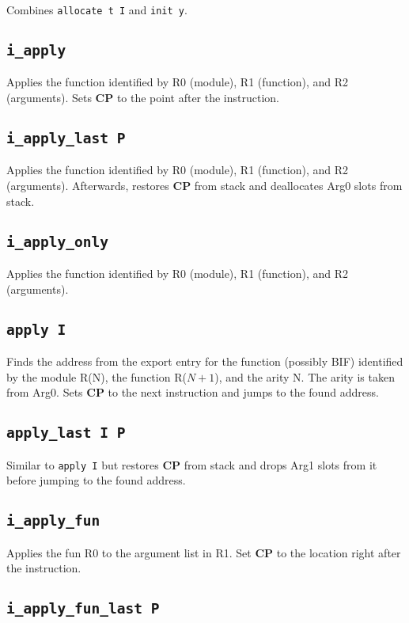 \documentclass{article}
\newcommand{\cp}{\textbf{CP}}
\newcommand{\iop}[1]{\texttt{#1}}
\begin{document}
Combines \iop{allocate t I} and \iop{init y}.

\subsection*{\iop{i\_apply}}

Applies the function identified by R0 (module), R1 (function), and R2
(arguments). Sets \cp{} to the point after the instruction.

\subsection*{\iop{i\_apply\_last P}}

Applies the function identified by R0 (module), R1 (function), and R2
(arguments). Afterwards, restores \cp{} from stack and deallocates Arg0 slots
from stack.

\subsection*{\iop{i\_apply\_only}}

Applies the function identified by R0 (module), R1 (function), and R2
(arguments).

\subsection*{\iop{apply I}}

Finds the address from the export entry for the function (possibly BIF)
identified by the module R(N), the function R($N+1$), and the arity N. The arity
is taken from Arg0. Sets \cp{} to the next instruction and jumps to the found
address.

\subsection*{\iop{apply\_last I P}}

Similar to \iop{apply I} but restores \cp{} from stack and drops Arg1 slots from
it before jumping to the found address.

\subsection*{\iop{i\_apply\_fun}}

Applies the fun R0 to the argument list in R1. Set \cp{} to the location right
after the instruction.

\subsection*{\iop{i\_apply\_fun\_last P}}
\end{document}

